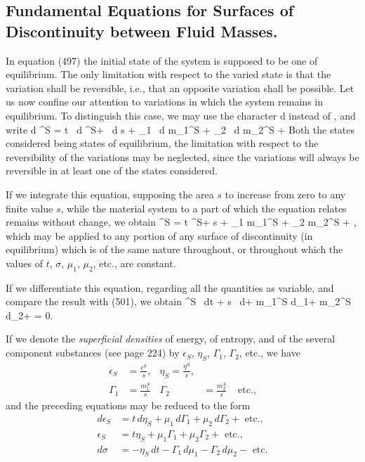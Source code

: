 \documentclass[12pt]{memoir}
\begin{document}
{\subsection{Fundamental Equations for Surfaces of Discontinuity between Fluid Masses.}
In equation (497) the initial state of the system is supposed to be one of equilibrium. The only limitation with respect to the varied state is that the variation shall be reversible, i.e., that an opposite variation shall be possible. Let us now confine our attention to variations in which the system remains in equilibrium. To distinguish this case, we may use the character d instead of , and write
\eqs d \epsilon^S = t \, d \eta^S+ \sigma \, d s + \mu_1 \, d m_1^S + \mu_2 \, d m_2^S +  \label{501} \eqe
Both the states considered being states of equilibrium, the limitation with respect to the reversibility of the variations may be neglected, since the variations will always be reversible in at least one of the states considered.


If we integrate this equation, supposing the area $s$ to increase from zero to any finite value $s$, while the material system to a part of which the equation relates remains without change, we obtain
\eqs   \epsilon^S = t \eta^S+ \sigma s + \mu_1  m_1^S + \mu_2 m_2^S + ,\label{502} \eqe
which may be applied to any portion of any surface of discontinuity (in equilibrium) which is of the same nature throughout, or throughout which the values of $t$, $\sigma$, $\mu_1$, $\mu_2$, etc., are constant.


If we differentiate this equation, regarding all the quantities as
variable, and compare the result with (501), we obtain
\eqs \eta^S \, dt + s \, d\sigma + m_1^S d\mu_1+ m_2^S d\mu_2+  = 0. \label{503} \eqe


If we denote the \textit{superficial densities} of energy, of entropy, and of the several component substances (see page 224) by $\epsilon_S$, $\eta_S$, $\Gamma_1$, $\Gamma_2$, etc., we have
\begin{align} \epsilon_S&=  \frac{\epsilon^S}{s},&    \eta_S=\frac{\eta^S}{s}, &  \label{504} \\
\Gamma_1 &= \frac{m_1^S}{s} & \Gamma_2 &= \frac{m_2^S}{s} & \text{ etc.},      \label{505}\end{align}
and the preceding equations may be reduced to the form
\begin{align}
d \epsilon_S &= t \, d \eta_S + \mu_1 \, d \Gamma_1 + \mu_2 \, d \Gamma_2+ \text{ etc.}, \label{506}\\
\epsilon_S &= t \eta_S + \mu_1 \Gamma_1 + \mu_2 \Gamma_2+ \text{ etc.}, \label{507}\\
d\sigma &= -\eta_S \, dt -\Gamma_1\,d \mu_1 -\Gamma_2\,d \mu_2- \text{ etc.}  \label{508}
\end{align}

}
\end{document}
